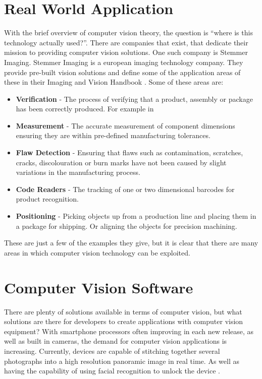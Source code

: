 \documentclass[11pt,oneside]{report}
\begin{document}
				\section{Real World Application}
					With the brief overview of computer vision theory, the question is ``where is this technology actually used?''.
					There are companies that exist, that dedicate their mission to providing computer vision solutions.
					One such company is Stemmer Imaging.
					Stemmer Imaging is a european imaging technology company.
					They provide pre-built vision solutions and define some of the application areas of these in their Imaging and Vision Handbook \cite{cat:stemmer}.
					Some of these areas are:
					\begin{itemize}
						\item \textbf{Verification} - The process of verifying that a product, assembly or package has been correctly produced. For example in 
						\item \textbf{Measurement} - The accurate measurement of component dimensions ensuring they are within pre-defined manufacturing tolerances.
						\item \textbf{Flaw Detection} - Ensuring that flaws such as contamination, scratches, cracks, discolouration or burn marks have not been caused by slight variations in the manufacturing process.
						\item \textbf{Code Readers} - The tracking of one or two dimensional barcodes for product recognition.
						\item \textbf{Positioning} - Picking objects up from a production line and placing them in a package for shipping. Or aligning the objects for precision machining.
					\end{itemize}
					These are just a few of the examples they give, but it is clear that there are many areas in which computer vision technology can be exploited.
					
				\section{Computer Vision Software}
					There are plenty of solutions available in terms of computer vision, but what solutions are there for developers to create applications with computer vision equipment?
					With smartphone processors often improving in each new release, as well as built in cameras, the demand for computer vision applications is increasing.
				Currently, devices are capable of stitching together several photographs into a high resolution panoramic image in real time.
				As well as having the capability of using facial recognition to unlock the device \cite{journal:face}.
					
\end{document}
